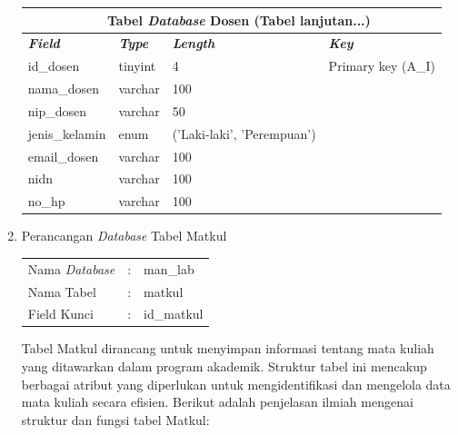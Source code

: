\begin{enumerate}
{\begin{longtable}{l l l l}
				      \multicolumn{4}{c}{\tablename\ \thetable\ {Tabel \textit{\textit{Database}} Dosen} \space (Tabel lanjutan...)} \\
				      \hline
				      \textbf{\textit{Field}} & \textbf{\textit{Type}} & \textbf{\textit{Length}}   & \textbf{\textit{Key}}          \\
				      \hline
				      \endhead

				      id\_dosen               & tinyint                & 4                          & Primary key (A\_I)             \\
				      nama\_dosen             & varchar                & 100                        &                                \\
				      nip\_dosen              & varchar                & 50                         &                                \\
				      jenis\_kelamin          & enum                   & ('Laki-laki', 'Perempuan') &                                \\
				      email\_dosen            & varchar                & 100                        &                                \\
				      nidn                    & varchar                & 100                        &                                \\
				      no\_hp                  & varchar                & 100                        &                                \\
				      \hline
			      \end{longtable}
		      }

	\item Perancangan \textit{Database} Tabel Matkul \\
	      \begin{tabular}{lll}
		      Nama \textit{Database} & : & man\_lab   \\
		      Nama Tabel             & : & matkul     \\
		      Field Kunci            & : & id\_matkul \\
	      \end{tabular}

	      Tabel Matkul dirancang untuk menyimpan informasi tentang mata kuliah yang ditawarkan dalam program akademik. Struktur tabel ini mencakup berbagai atribut yang diperlukan untuk mengidentifikasi dan mengelola data mata kuliah secara efisien. Berikut adalah penjelasan ilmiah mengenai struktur dan fungsi tabel Matkul:


\end{enumerate}
